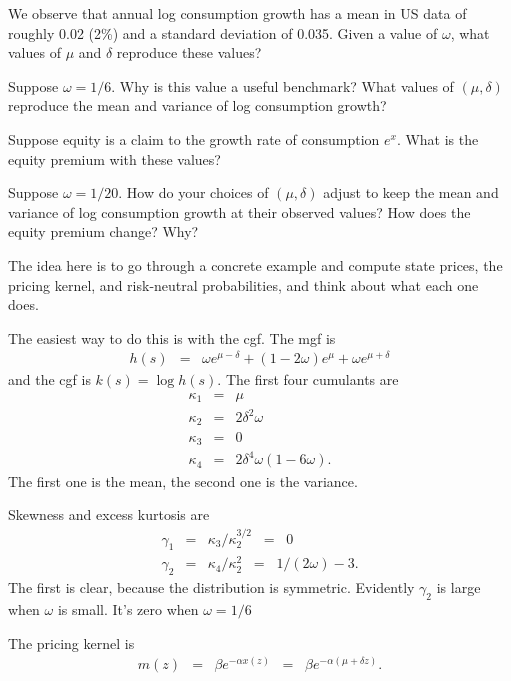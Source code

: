 \documentclass[11pt]{exam}
\begin{document}
\begin{questions}
\begin{parts}
\item We observe that annual log consumption growth has a mean in US data of roughly 0.02 (2\%)
and a standard deviation of 0.035.
Given a value of $\omega$, what values of $\mu$ and $\delta$ reproduce
these values?

\item Suppose $\omega = 1/6$.  Why is this value a useful benchmark?
What values of $(\mu,\delta)$ reproduce the mean and variance of log consumption growth?

\item Suppose equity is a claim to the growth rate of consumption $e^x$.
What is the equity premium with these values?

\item Suppose $\omega = 1/20$.
How do your choices of $(\mu,\delta)$ adjust to keep the mean and variance
of log consumption growth at their observed values?
How does the equity premium change?
Why?
\end{parts}

\begin{solution}
The idea here is to go through a concrete example
and compute state prices, the pricing kernel,
and risk-neutral probabilities, and think about what each
one does.
\begin{parts}
\item The easiest way to do this is with the cgf.
The mgf is
\begin{eqnarray*}
    h(s) &=& \omega e^{\mu - \delta} + (1-2\omega) e^\mu + \omega e^{\mu+\delta}
\end{eqnarray*}
and the cgf is $k(s) = \log h(s)$.
The first four cumulants are
\begin{eqnarray*}
    \kappa_1 &=& \mu \\
    \kappa_2 &=& 2\delta^2 \omega \\
    \kappa_3 &=& 0 \\
    \kappa_4 &=& 2 \delta^4 \omega (1-6 \omega).
\end{eqnarray*}
The first one is the mean, the second one is the variance.

\item Skewness and excess kurtosis are
\begin{eqnarray*}
    \gamma_1  &=& \kappa_3/\kappa_2^{3/2} \;\;=\;\; 0 \\
    \gamma_2  &=& \kappa_4/\kappa_2^{2} \;\;=\;\; 1/(2 \omega) - 3 .
\end{eqnarray*}
The first is clear, because the distribution is symmetric.
Evidently $\gamma_2$ is large when $\omega$ is small.
It's zero when $\omega = 1/6$
\item The pricing kernel is
\begin{eqnarray*}
    m(z) &=& \beta e^{-\alpha x(z)}
            \;\;=\;\;  \beta e^{-\alpha (\mu + \delta z)} .
\end{eqnarray*}


\end{parts}
\end{solution}
\end{questions}
\end{document}
